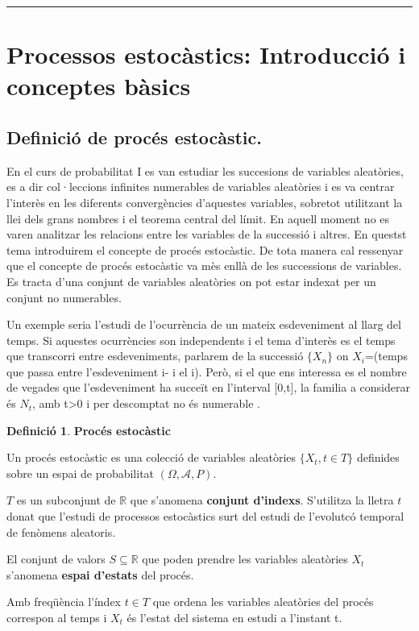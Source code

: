 \documentclass[
  catalan,
]{article}
\theoremstyle{definition}
\newtheorem{definition}{Definició}[section]
\theoremstyle{definition}
\theoremstyle{definition}
\theoremstyle{definition}
\theoremstyle{remark}
\begin{document}
\begin{center}\rule{0.5\linewidth}{0.5pt}\end{center}

\section{Processos estocàstics: Introducció i conceptes bàsics}\label{processos-estocuxe0stics-introducciuxf3-i-conceptes-buxe0sics}

\subsection{Definició de procés estocàstic.}\label{definiciuxf3-de-procuxe9s-estocuxe0stic.}

En el curs de probabilitat I es van estudiar les succesions de variables aleatòries, es a dir col·leccions infinites numerables de variables aleatòries i es va centrar l'interès en les diferents convergències d'aquestes variables, sobretot utilitzant la llei dels grans nombres i el teorema central del límit. En aquell moment no es varen analitzar les relacions entre les variables de la successió i altres.
En questst tema introduirem el concepte de procés estocàstic. De tota manera cal ressenyar que el concepte de procés estocàstic va mès enllà de les successions de variables. Es tracta d'una conjunt de variables aleatòries on pot estar indexat per un conjunt no numerables.

Un exemple seria l'estudi de l'ocurrència de un mateix esdeveniment al llarg del temps. Si aquestes ocurrències son independents i el tema d'interès es el temps que transcorri entre esdeveniments, parlarem de la successió \(\{X_n\}\) on \(X_i\)=(temps que passa entre l'esdeveniment i- i el i). Però, si el que ens interessa es el nombre de vegades que l'esdeveniment ha succeït en l'interval {[}0,t{]}, la familia a considerar és \(N_t\), amb t\textgreater0 i per descomptat no és numerable .

\begin{definition}
\textbf{Procés estocàstic}

Un procés estocàstic es una colecció de variables aleatòries \(\{ X_t,t \in T \}\) definides sobre un espai de probabilitat \((\Omega, \mathcal{A},P)\).

\(T\) es un subconjunt de \(\mathbb{R}\) que s'anomena \textbf{conjunt d'indexs}. S'utilitza la lletra \(t\) donat que l'estudi de processos estocàstics surt del estudi de l'evolutcó temporal de fenòmens aleatoris.

El conjunt de valors \(S \subseteq \mathbb{R}\) que poden prendre les variables aleatòries \(X_t\) s'anomena \textbf{espai d'estats} del procés.

Amb freqüència l'índex \(t \in T\) que ordena les variables aleatòries del procés correspon al temps i \(X_t\) és l'estat del sistema en estudi a l'instant t.
\end{definition}
\end{document}
